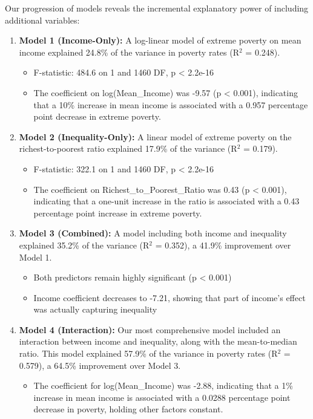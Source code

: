 \documentclass[12pt,a4paper]{article}
\begin{document}
Our progression of models reveals the incremental explanatory power of including additional variables:
\begin{enumerate}
    \item \textbf{Model 1 (Income-Only):} A log-linear model of extreme poverty on mean income explained 24.8\% of the variance in poverty rates (R$^2$ = 0.248). 
    \begin{itemize}
        \item F-statistic: 484.6 on 1 and 1460 DF, p < 2.2e-16
        \item The coefficient on log(Mean\_Income) was -9.57 (p < 0.001), indicating that a 10\% increase in mean income is associated with a 0.957 percentage point decrease in extreme poverty.
    \end{itemize}
    \item \textbf{Model 2 (Inequality-Only):} A linear model of extreme poverty on the richest-to-poorest ratio explained 17.9\% of the variance (R$^2$ = 0.179). 
    \begin{itemize}
        \item F-statistic: 322.1 on 1 and 1460 DF, p < 2.2e-16
        \item The coefficient on Richest\_to\_Poorest\_Ratio was 0.43 (p < 0.001), indicating that a one-unit increase in the ratio is associated with a 0.43 percentage point increase in extreme poverty.
    \end{itemize}
    \item \textbf{Model 3 (Combined):} A model including both income and inequality explained 35.2\% of the variance (R$^2$ = 0.352), a 41.9\% improvement over Model 1. 
    \begin{itemize}
        \item Both predictors remain highly significant (p < 0.001)
        \item Income coefficient decreases to -7.21, showing that part of income's effect was actually capturing inequality
    \end{itemize}
    \item \textbf{Model 4 (Interaction):} Our most comprehensive model included an interaction between income and inequality, along with the mean-to-median ratio. This model explained 57.9\% of the variance in poverty rates (R$^2$ = 0.579), a 64.5\% improvement over Model 3. 
    \begin{itemize}
        \item The coefficient for log(Mean\_Income) was -2.88, indicating that a 1\% increase in mean income is associated with a 0.0288 percentage point decrease in poverty, holding other factors constant.

\end{itemize}
\end{enumerate}
\end{document}
